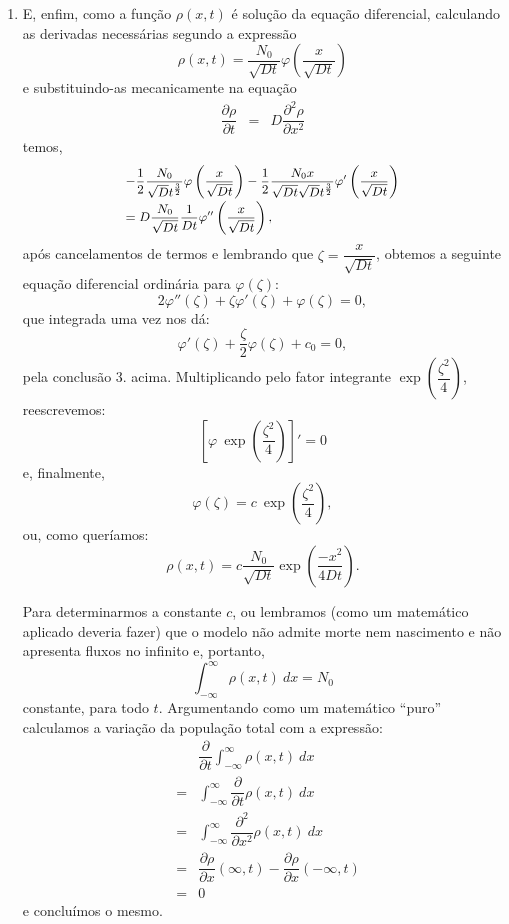 \begin{enumerate}
    \item E, enfim, como a função \(\rho(x, t)\) é solução da equação diferencial, calculando as derivadas necessárias segundo a expressão
    \[\rho(x, t) = \dfrac{N_{0}}{\sqrt{Dt}} \varphi\left(\dfrac{x}{\sqrt{D t}}\right)\]
    e substituindo-as mecanicamente na equação
    \[\begin{array}{rcl}
    \dfrac{\partial \rho}{\partial t} &=& D \dfrac{\partial^2 \rho}{\partial x^2}
    \end{array}\]
    temos,
    \[\small
    \begin{array}{l}
    -\dfrac{1}{2} \dfrac{N_{0}}{\sqrt{D} t^{\frac{3}{2}}} \varphi\left(\dfrac{x}{\sqrt{Dt}}\right) %
    -\dfrac{1}{2} \dfrac{N_{0}x}{\sqrt{Dt} \sqrt{D} t^{\frac{3}{2}}} \varphi'\left(\dfrac{x}{\sqrt{Dt}}\right) \\[0.3cm]
    = D \dfrac{N_{0}}{\sqrt{Dt}} \dfrac{1}{Dt} \varphi''\left(\dfrac{x}{\sqrt{Dt}}\right),
    \end{array}\]
    após cancelamentos de termos e lembrando que \(\zeta = \dfrac{x}{\sqrt{Dt}}\), obtemos a seguinte equação diferencial ordinária para \(\varphi(\zeta)\):
    \[2\varphi''(\zeta)+\zeta\varphi'(\zeta)+\varphi(\zeta)= 0,\]
    que integrada uma vez nos dá:
    {\red \[\varphi'(\zeta) + \dfrac{\zeta}{2}\varphi(\zeta) + c_{0} = 0,\]}
    pela conclusão 3. acima. Multiplicando pelo fator integrante \(\exp\left(\dfrac{\zeta^2}{4}\right)\), reescrevemos:
    \[\left[\varphi\ \exp\left(\dfrac{\zeta^2}{4}\right)\right]' = 0\] e, finalmente,
    \[\varphi(\zeta) = c\ \exp\left(\dfrac{\zeta^2}{4}\right),\]
    ou, como queríamos:
    \[\rho(x, t) = c \dfrac{N_{0}}{\sqrt{Dt}} \exp\left(\dfrac{-x^2}{4Dt}\right).\]

    Para determinarmos a constante \(c\), ou lembramos (como um matemático aplicado deveria fazer) que o modelo não admite morte nem nascimento e não apresenta fluxos no infinito e, portanto,
    \[\displaystyle \int_{-\infty}^{\infty} \rho(x,t)\ dx = N_{0}\]
    constante, para todo \(t\). Argumentando como um matemático ``puro'' calculamos a variação da população total com a expressão:
    \[\begin{array}{rcl}
    & & \dfrac{\partial}{\partial t} \displaystyle\int_{-\infty}^{\infty} \rho(x, t) \ dx \\[0.4cm]
    &=& \displaystyle\int_{-\infty}^{\infty} \dfrac{\partial}{\partial t} \rho(x, t) \ dx \\[0.4cm]
    &=& \displaystyle\int_{-\infty}^{\infty} \dfrac{\partial^2}{\partial x^2} \rho(x, t) \ dx \\[0.4cm]
    &=& \dfrac{\partial \rho}{\partial x} (\infty, t) - \dfrac{\partial \rho}{\partial x} (-\infty, t) \\[0.4cm]
    &=& 0
    \end{array}\]
    e concluímos o mesmo.


\end{enumerate}
